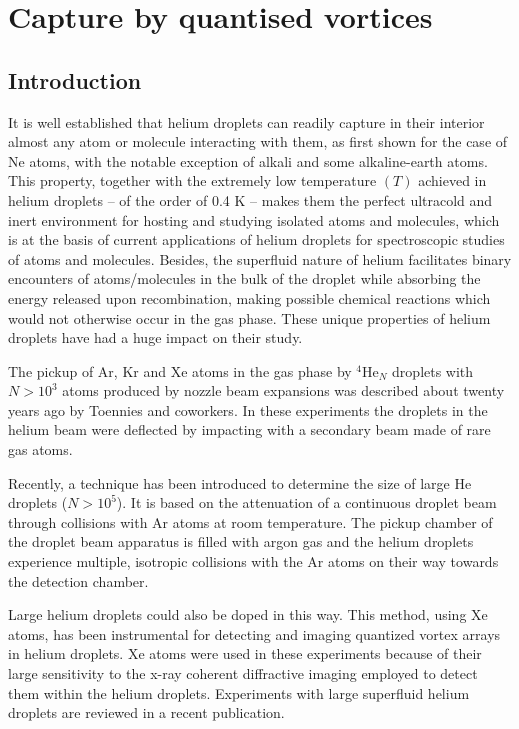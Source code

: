 \chapter{Capture by quantised vortices}
	\section{Introduction}
		It is well established that helium droplets can readily capture in their interior almost any atom or molecule interacting with them, as first shown for the case of Ne atoms,\citep{Sch90} with the notable exception of alkali\citep{Sti96} and some alkaline-earth\citep{Her07} atoms. This property, together with the extremely low temperature $(T)$ achieved in helium droplets -- of the order of 0.4 K -- makes them the perfect ultracold and inert environment for hosting and studying isolated atoms and molecules, which is at the basis of current applications of helium droplets for spectroscopic studies of atoms and molecules. Besides, the superfluid nature of helium facilitates binary encounters of atoms/molecules in the bulk of the droplet while absorbing the energy released upon recombination, making possible chemical reactions which would not otherwise occur in the gas phase. These unique properties  of helium droplets have had a huge impact on their study.\citep{Toe04,Sti06,Tig07,Cal11a,Mud14}

		The pickup of Ar, Kr and Xe atoms in the gas phase by $^4$He$_N$ droplets with $N> 10^3$ atoms produced by nozzle beam expansions was described about twenty years ago by Toennies and coworkers.\citep{Lew95} In these experiments the droplets in the helium beam were deflected by impacting with a secondary beam made of rare gas atoms. 

		Recently, a technique has been introduced to determine the size of large He droplets ($N> 10^5$). It is based on the attenuation of a continuous droplet beam through collisions with Ar atoms at room temperature.\citep{Gom11} The pickup chamber of the droplet beam apparatus is filled with argon gas and the helium droplets experience multiple, isotropic collisions with the Ar atoms on their way towards the detection chamber. 

		Large helium droplets could also be doped in this way. This method, using Xe atoms, has been instrumental for detecting and imaging quantized vortex arrays in helium droplets.\citep{Gom14,Jon16} Xe atoms were used in these experiments because of their large sensitivity to the x-ray coherent diffractive imaging employed to detect them within the helium droplets. Experiments with large superfluid helium droplets are reviewed in a recent publication.\citep{Tan17}

